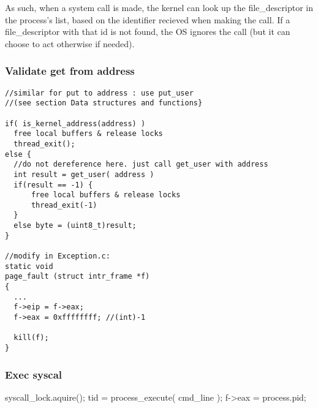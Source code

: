     As such, when a system call is made, the kernel can look up the file\_descriptor in the process's list, based on the identifier recieved when making the call. If a file\_descriptor with that id is not found, the OS ignores the call (but it can choose to act otherwise if needed).

    \subsubsection{Validate get from address}
    \vspace{-1em} %
      \begin{lstlisting}
//similar for put to address : use put_user
//(see section Data structures and functions}

if( is_kernel_address(address) )
  free local buffers & release locks
  thread_exit(); 
else {
  //do not dereference here. just call get_user with address
  int result = get_user( address ) 
  if(result == -1) {
      free local buffers & release locks
      thread_exit(-1)
  }	
  else byte = (uint8_t)result;
}

//modify in Exception.c:
static void
page_fault (struct intr_frame *f)
{
  ...
  f->eip = f->eax;
  f->eax = 0xffffffff; //(int)-1
  
  kill(f);
}
      \end{lstlisting}

    \subsubsection{Exec syscal}
    \vspace{-3em}
    \begin{program}
      syscall\_lock.aquire();
      tid = process\_execute( cmd\_line );
      f->eax = process.pid;
    \end{program}

